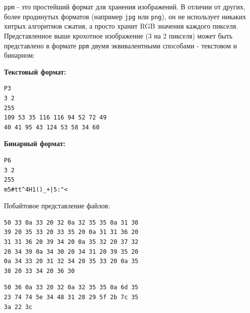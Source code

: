 \documentclass{article}
\begin{document}
\texttt{ppm} - это простейший формат для хранения изображений. В отличии от других, более продинутых форматов (например \texttt{jpg} или \texttt{png}), он не использует никаких хитрых алгоритмов сжатия, а просто хранит RGB значения каждого пикселя. Представленное выше крохотное изображение (3 на 2 пикселя) может быть представлено в формате \texttt{ppm} двумя эквивалентными способами - текстовом и бинарном:\\

\begin{multicols}{2}
\textbf{Текстовый формат:} 
\begin{verbatim}
P3
3 2
255
109 53 35 116 116 94 52 72 49 
40 41 95 43 124 53 58 34 60
\end{verbatim}
\vfill\null
\columnbreak
\textbf{Бинарный формат:} 
\begin{verbatim}
P6
3 2
255
m5#tt^4H1()_+|5:"<
\end{verbatim}
\vfill\null
\end{multicols}

Побайтовое представление файлов:
\begin{multicols}{2}
\begin{verbatim}
50 33 0a 33 20 32 0a 32 35 35 0a 31 30
39 20 35 33 20 33 35 20 0a 31 31 36 20 
31 31 36 20 39 34 20 0a 35 32 20 37 32 
20 34 39 0a 34 30 20 34 31 20 39 35 20 
0a 34 33 20 31 32 34 20 35 33 20 0a 35 
38 20 33 34 20 36 30
\end{verbatim}
\vfill\null
\columnbreak
\begin{verbatim}
50 36 0a 33 20 32 0a 32 35 35 0a 6d 35
23 74 74 5e 34 48 31 28 29 5f 2b 7c 35 
3a 22 3c
\end{verbatim}
\end{multicols}
\end{document}
